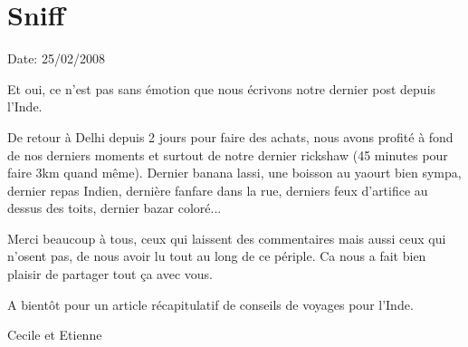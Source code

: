 \section{Sniff}

Date: 25/02/2008

\begin{multicols}{2}

Et oui, ce n'est pas sans émotion que nous écrivons notre dernier post depuis l'Inde.

De retour à Delhi depuis 2 jours pour faire des achats, nous avons profité à fond de nos derniers moments et surtout de notre dernier rickshaw (45 minutes pour faire 3km quand même). Dernier banana lassi, une boisson au yaourt bien sympa, dernier repas Indien, dernière fanfare dans la rue, derniers feux d'artifice au dessus des toits, dernier bazar coloré...

Merci beaucoup à tous, ceux qui laissent des commentaires mais aussi ceux qui n'osent pas, de nous avoir lu tout au long de ce périple. Ca nous a fait bien plaisir de partager tout ça avec vous.

A bientôt pour un article récapitulatif de conseils de voyages pour l'Inde.

Cecile et Etienne

\end{multicols}
